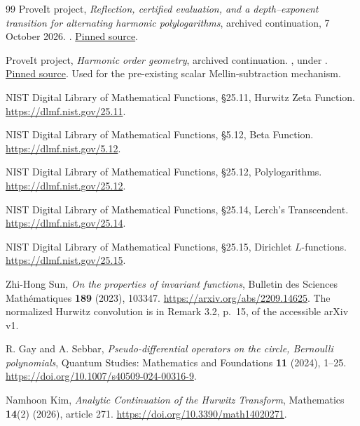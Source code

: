 \documentclass[11pt,letterpaper]{article}
\numberwithin{equation}{section}
\theoremstyle{plain}
\theoremstyle{definition}
\theoremstyle{remark}
\begin{document}
\begin{thebibliography}{99}
ProveIt project,
\emph{Reflection, certified evaluation, and a depth--exponent
transition for alternating harmonic polylogarithms},
archived continuation, 7 October 2026.
.
\href{https://github.com/VladimirReshetnikov/ProveIt/blob/e0d9463bdee9685dfb1dddb819059cc738540c57/Analysis/Polylogarithms/docs/reports/alternating-harmonic-polylogarithms/article.tex}{Pinned source}.

ProveIt project,
\emph{Harmonic order geometry}, archived continuation.
,
under .
\href{https://github.com/VladimirReshetnikov/ProveIt/blob/e0d9463bdee9685dfb1dddb819059cc738540c57/Analysis/Polylogarithms/docs/reports/lerch-global-phase/continuations/harmonic-order-geometry/sections/harmonic_order.tex}{Pinned source}.
Used for the pre-existing scalar Mellin-subtraction mechanism.

NIST Digital Library of Mathematical Functions,
\S25.11, Hurwitz Zeta Function.
\url{https://dlmf.nist.gov/25.11}.

NIST Digital Library of Mathematical Functions,
\S5.12, Beta Function.
\url{https://dlmf.nist.gov/5.12}.

NIST Digital Library of Mathematical Functions,
\S25.12, Polylogarithms.
\url{https://dlmf.nist.gov/25.12}.

NIST Digital Library of Mathematical Functions,
\S25.14, Lerch's Transcendent.
\url{https://dlmf.nist.gov/25.14}.

NIST Digital Library of Mathematical Functions,
\S25.15, Dirichlet \(L\)-functions.
\url{https://dlmf.nist.gov/25.15}.

Zhi-Hong Sun,
\emph{On the properties of invariant functions},
Bulletin des Sciences Math\'ematiques \textbf{189} (2023), 103347.
\url{https://arxiv.org/abs/2209.14625}.
The normalized Hurwitz convolution is in Remark 3.2, p.~15,
of the accessible arXiv v1.

R. Gay and A. Sebbar,
\emph{Pseudo-differential operators on the circle, Bernoulli polynomials},
Quantum Studies: Mathematics and Foundations \textbf{11} (2024), 1--25.
\url{https://doi.org/10.1007/s40509-024-00316-9}.

Namhoon Kim,
\emph{Analytic Continuation of the Hurwitz Transform},
Mathematics \textbf{14}(2) (2026), article 271.
\url{https://doi.org/10.3390/math14020271}.


\end{thebibliography}
\end{document}
